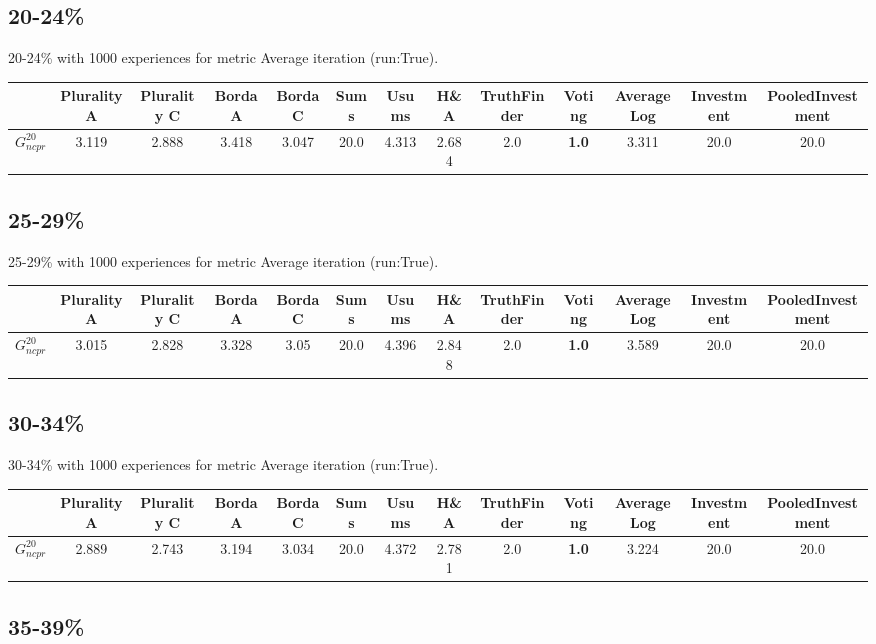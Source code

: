 \documentclass{article}
\newcommand{\graph}[2]{$G_{#1}^{#2}$}
\begin{document}
\subsection{20-24\%}

20-24\% with 1000 experiences for metric Average iteration (run:True).

\noindent\begin{tabular}{|l|c|c|c|c|c|c|c|c|c|c|c|c|}
\hline
& Plurality A& Plurality C& Borda A& Borda C& Sums& Usums& H\&A& TruthFinder& Voting& AverageLog& Investment& PooledInvestment\\
\hline
\graph{ncpr}{20} &3.119&2.888&3.418&3.047&20.0&4.313&2.684&2.0&\textbf{1.0}&3.311&20.0&20.0\\
\hline
\end{tabular}
\newpage

\subsection{25-29\%}

25-29\% with 1000 experiences for metric Average iteration (run:True).

\noindent\begin{tabular}{|l|c|c|c|c|c|c|c|c|c|c|c|c|}
\hline
& Plurality A& Plurality C& Borda A& Borda C& Sums& Usums& H\&A& TruthFinder& Voting& AverageLog& Investment& PooledInvestment\\
\hline
\graph{ncpr}{20} &3.015&2.828&3.328&3.05&20.0&4.396&2.848&2.0&\textbf{1.0}&3.589&20.0&20.0\\
\hline
\end{tabular}
\newpage

\subsection{30-34\%}

30-34\% with 1000 experiences for metric Average iteration (run:True).

\noindent\begin{tabular}{|l|c|c|c|c|c|c|c|c|c|c|c|c|}
\hline
& Plurality A& Plurality C& Borda A& Borda C& Sums& Usums& H\&A& TruthFinder& Voting& AverageLog& Investment& PooledInvestment\\
\hline
\graph{ncpr}{20} &2.889&2.743&3.194&3.034&20.0&4.372&2.781&2.0&\textbf{1.0}&3.224&20.0&20.0\\
\hline
\end{tabular}
\newpage

\subsection{35-39\%}
\end{document}

